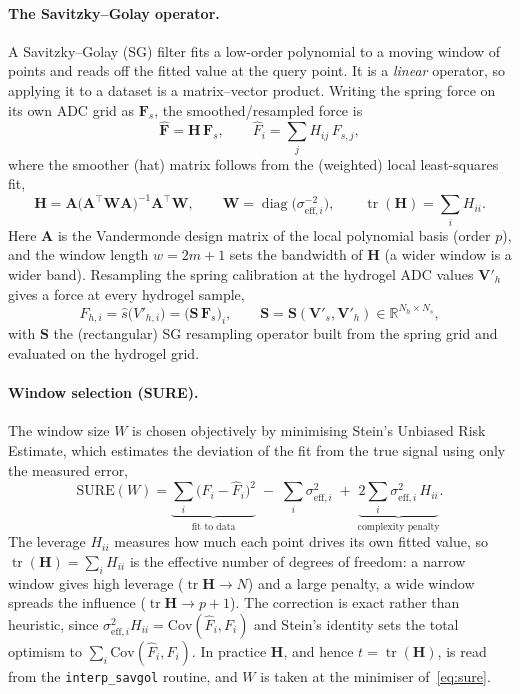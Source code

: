 \documentclass[11pt]{article}
\newcommand{\dset}[1]{\mathbf{#1}}          %
\begin{document}
\paragraph{The Savitzky--Golay operator.}
A Savitzky--Golay (SG) filter fits a low-order polynomial to a moving window of points and
reads off the fitted value at the query point. It is a \emph{linear} operator, so applying it
to a dataset is a matrix--vector product. Writing the spring force on its own ADC grid as
$\dset{F}_s$, the smoothed/resampled force is
\begin{equation}
\hat{\dset{F}}=\dset{H}\,\dset{F}_s,
\qquad
\hat F_i=\sum_{j} H_{ij}\,F_{s,j},
\end{equation}
where the smoother (hat) matrix follows from the (weighted) local least-squares fit,
\begin{equation}
\dset{H}=\dset{A}\bigl(\dset{A}^{\!\top}\dset{W}\dset{A}\bigr)^{-1}\dset{A}^{\!\top}\dset{W},
\qquad
\dset{W}=\operatorname{diag}\!\bigl(\sigma_{\mathrm{eff},i}^{-2}\bigr),
\qquad
\operatorname{tr}(\dset{H})=\sum_i H_{ii}.
\end{equation}
Here $\dset{A}$ is the Vandermonde design matrix of the local polynomial basis (order $p$),
and the window length $w=2m+1$ sets the bandwidth of $\dset{H}$ (a wider window is a wider
band). Resampling the spring calibration at the hydrogel ADC values $\dset{V}'_h$ gives a
force at every hydrogel sample,
\begin{equation}
F_{h,i}=\hat{s}\bigl(V'_{h,i}\bigr)=\bigl(\dset{S}\,\dset{F}_s\bigr)_i,
\qquad
\dset{S}=\dset{S}(\dset{V}'_s,\dset{V}'_h)\in\mathbb{R}^{N_h\times N_s},
\end{equation}
with $\dset{S}$ the (rectangular) SG resampling operator built from the spring grid and
evaluated on the hydrogel grid.

\paragraph{Window selection (SURE).}
The window size $W$ is chosen objectively by minimising Stein's Unbiased Risk Estimate, which
estimates the deviation of the fit from the true signal using only the measured error,
\begin{equation}
\mathrm{SURE}(W)=\underbrace{\sum_i\bigl(F_i-\hat F_i\bigr)^2}_{\text{fit to data}}
\;-\;\sum_i\sigma_{\mathrm{eff},i}^2
\;+\;\underbrace{2\sum_i\sigma_{\mathrm{eff},i}^2\,H_{ii}}_{\text{complexity penalty}} .
\label{eq:sure}
\end{equation}
The leverage $H_{ii}$ measures how much each point drives its own fitted value, so
$\operatorname{tr}(\dset{H})=\sum_i H_{ii}$ is the effective number of degrees of freedom: a
narrow window gives high leverage ($\operatorname{tr}\dset{H}\!\to\!N$) and a large penalty,
a wide window spreads the influence ($\operatorname{tr}\dset{H}\!\to\!p+1$). The correction is
exact rather than heuristic, since $\sigma_{\mathrm{eff},i}^2H_{ii}=\mathrm{Cov}(\hat F_i,F_i)$
and Stein's identity sets the total optimism to $\sum_i\mathrm{Cov}(\hat F_i,F_i)$. In
practice $\dset{H}$, and hence $t=\operatorname{tr}(\dset{H})$, is read from the
\texttt{interp\_savgol} routine, and $W$ is taken at the minimiser of~\eqref{eq:sure}.
\end{document}
